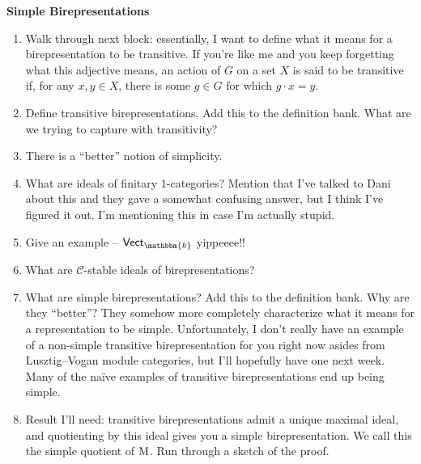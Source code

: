 \noindent\textbf{Simple Birepresentations}
\begin{enumerate}[label=$\bullet$, leftmargin=1\parindent]
\item Walk through next block: essentially, I want to define what it means for a birepresentation to be transitive. If you're like me and you keep forgetting what this adjective means, an action of $G$ on a set $X$ is said to be transitive if, for any $x, y \in X$, there is some $g \in G$ for which $g \cdot x = y$.
\item Define transitive birepresentations. Add this to the definition bank. What are we trying to capture with transitivity?
\item There is a ``better'' notion of simplicity.
\item What are ideals of finitary $1$-categories? Mention that I've talked to Dani about this and they gave a somewhat confusing answer, but I think I've figured it out. I'm mentioning this in case I'm actually stupid.
\item Give an example -- $\textsf{Vect}_\mathbbm{k}$ yippeeee!!
\item What are $\mathscr{C}$-stable ideals of birepresentations?
\item What are simple birepresentations? Add this to the definition bank. Why are they ``better''? They somehow more completely characterize what it means for a representation to be simple. Unfortunately, I don't really have an example of a non-simple transitive birepresentation for you right now asides from Lusztig--Vogan module categories, but I'll hopefully have one next week. Many of the na\"{i}ve examples of transitive birepresentations end up being simple.
\item Result I'll need: transitive birepresentations admit a unique maximal ideal, and quotienting by this ideal gives you a simple birepresentation. We call this the simple quotient of $\textnormal{M}$. Run through a sketch of the proof.\\
\end{enumerate}

